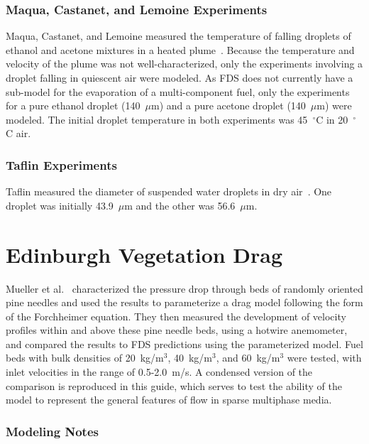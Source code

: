 \subsubsection{Maqua, Castanet, and Lemoine Experiments}
\label{Maqua_exp}

Maqua, Castanet, and Lemoine measured the temperature of falling droplets of ethanol and acetone mixtures in a heated plume~\cite{Maqua}. Because the temperature and velocity of the plume was not well-characterized, only the experiments involving a droplet falling in quiescent air were modeled. As FDS does not currently have a sub-model for the evaporation of a multi-component fuel, only the experiments for a pure ethanol droplet (140~$\mu$m) and a pure acetone droplet (140~$\mu$m) were modeled. The initial droplet temperature in both experiments was 45~$^\circ$C in 20~$^\circ$C air.

\subsubsection{Taflin Experiments}
\label{Taflin_exp}

Taflin measured the diameter of suspended water droplets in dry air~\cite{Snegirev:1}. One droplet was initially 43.9~$\mu$m and the other was 56.6~$\mu$m.

\section{Edinburgh Vegetation Drag}
\label{Edinburgh_Veg_Drag_Description}

Mueller et al.~\cite{Mueller:TIPM2021} characterized the pressure drop through beds of randomly oriented pine needles and used the results to parameterize a drag model following the form of the Forchheimer equation. They then measured the development of velocity profiles within and above these pine needle beds, using a hotwire anemometer, and compared the results to FDS predictions using the parameterized model. Fuel beds with bulk densities of 20~kg/m$^3$, 40~kg/m$^3$, and 60~kg/m$^3$ were tested, with inlet velocities in the range of 0.5-2.0~m/s. A condensed version of the comparison is reproduced in this guide, which serves to test the ability of the model to represent the general features of flow in sparse multiphase media.

\subsubsection{Modeling Notes}

